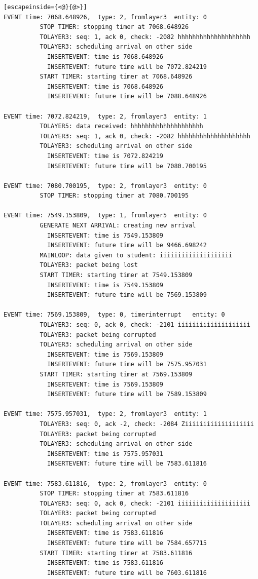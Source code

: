 \documentclass[paper=a4, fontsize=11pt]{scrartcl}
\numberwithin{equation}{section}		%
\numberwithin{figure}{section}			%
\numberwithin{table}{section}				%
\begin{document}
\begin{lstlisting}[escapeinside={<@}{@>}]
EVENT time: 7068.648926,  type: 2, fromlayer3  entity: 0
          STOP TIMER: stopping timer at 7068.648926
          TOLAYER3: seq: 1, ack 0, check: -2082 hhhhhhhhhhhhhhhhhhhh
          TOLAYER3: scheduling arrival on other side
            INSERTEVENT: time is 7068.648926
            INSERTEVENT: future time will be 7072.824219
          START TIMER: starting timer at 7068.648926
            INSERTEVENT: time is 7068.648926
            INSERTEVENT: future time will be 7088.648926

EVENT time: 7072.824219,  type: 2, fromlayer3  entity: 1
          TOLAYER5: data received: hhhhhhhhhhhhhhhhhhhh
          TOLAYER3: seq: 1, ack 0, check: -2082 hhhhhhhhhhhhhhhhhhhh
          TOLAYER3: scheduling arrival on other side
            INSERTEVENT: time is 7072.824219
            INSERTEVENT: future time will be 7080.700195

EVENT time: 7080.700195,  type: 2, fromlayer3  entity: 0
          STOP TIMER: stopping timer at 7080.700195

EVENT time: 7549.153809,  type: 1, fromlayer5  entity: 0
          GENERATE NEXT ARRIVAL: creating new arrival
            INSERTEVENT: time is 7549.153809
            INSERTEVENT: future time will be 9466.698242
          MAINLOOP: data given to student: iiiiiiiiiiiiiiiiiiii
          TOLAYER3: packet being lost
          START TIMER: starting timer at 7549.153809
            INSERTEVENT: time is 7549.153809
            INSERTEVENT: future time will be 7569.153809

EVENT time: 7569.153809,  type: 0, timerinterrupt   entity: 0
          TOLAYER3: seq: 0, ack 0, check: -2101 iiiiiiiiiiiiiiiiiiii
          TOLAYER3: packet being corrupted
          TOLAYER3: scheduling arrival on other side
            INSERTEVENT: time is 7569.153809
            INSERTEVENT: future time will be 7575.957031
          START TIMER: starting timer at 7569.153809
            INSERTEVENT: time is 7569.153809
            INSERTEVENT: future time will be 7589.153809

EVENT time: 7575.957031,  type: 2, fromlayer3  entity: 1
          TOLAYER3: seq: 0, ack -2, check: -2084 Ziiiiiiiiiiiiiiiiiii
          TOLAYER3: packet being corrupted
          TOLAYER3: scheduling arrival on other side
            INSERTEVENT: time is 7575.957031
            INSERTEVENT: future time will be 7583.611816

EVENT time: 7583.611816,  type: 2, fromlayer3  entity: 0
          STOP TIMER: stopping timer at 7583.611816
          TOLAYER3: seq: 0, ack 0, check: -2101 iiiiiiiiiiiiiiiiiiii
          TOLAYER3: packet being corrupted
          TOLAYER3: scheduling arrival on other side
            INSERTEVENT: time is 7583.611816
            INSERTEVENT: future time will be 7584.657715
          START TIMER: starting timer at 7583.611816
            INSERTEVENT: time is 7583.611816
            INSERTEVENT: future time will be 7603.611816


\end{lstlisting}
\end{document}
